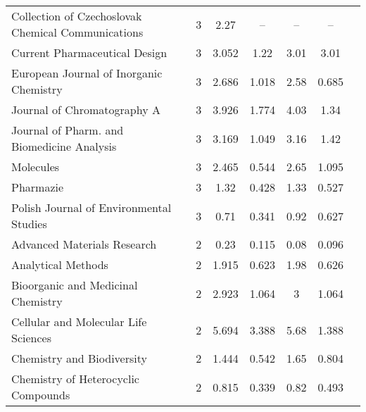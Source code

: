 {\begin{longtable}[c]{lcccccc}
  Collection of Czechoslovak Chemical Communications                                 & 3      & 2.27    & --   &   --        & --                    \\
 Current Pharmaceutical Design                                                      & 3      & 3.052   & 1.22  &  3.01      & 3.01                  \\[1ex]
 European Journal of Inorganic Chemistry                                            & 3      & 2.686   & 1.018 &  2.58      & 0.685                 \\
 Journal of Chromatography A~& 3      & 3.926   & 1.774 &  4.03      & 1.34                  \\
 Journal of Pharm. and Biomedicine Analysis                                         & 3      & 3.169   & 1.049 &  3.16      & 1.42                  \\
 Molecules                                                                          & 3      & 2.465   & 0.544 &  2.65      & 1.095                 \\
 Pharmazie                                                                          & 3      & 1.32    & 0.428 &  1.33      & 0.527                 \\[1ex]
 Polish Journal of Environmental Studies                                            & 3      & 0.71    & 0.341 &  0.92      & 0.627                 \\
 Advanced Materials Research                                                        & 2      & 0.23    & 0.115 &  0.08      & 0.096                 \\
 Analytical Methods                                                                 & 2      & 1.915   & 0.623 &  1.98      & 0.626                 \\
 Bioorganic and Medicinal Chemistry                                                 & 2      & 2.923   & 1.064 &  3         & 1.064                 \\
 Cellular and Molecular Life Sciences                                               & 2      & 5.694   & 3.388 &  5.68      & 1.388                 \\[1ex]
 Chemistry and Biodiversity                                                         & 2      & 1.444   & 0.542 &  1.65      & 0.804                 \\
 Chemistry of Heterocyclic Compounds                                                & 2      & 0.815   & 0.339 &  0.82      & 0.493                 \\

\end{longtable}}
